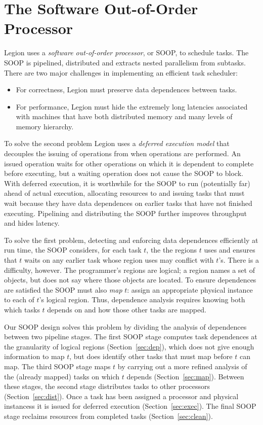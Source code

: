 \section{The Software Out-of-Order Processor}
\label{sec:soop}

Legion uses a {\em  software out-of-order processor}, or SOOP, to schedule tasks.  The SOOP 
is pipelined, distributed and extracts nested parallelism from subtasks.
There are two major challenges in implementing an efficient task scheduler:
\begin{itemize}
\item  For correctness, Legion must preserve data dependences between tasks.

\item For performance, Legion must hide the extremely long latencies associated
  with machines that have both distributed memory and many levels of
  memory hierarchy.
\end{itemize}

To solve the second problem Legion uses a {\em deferred execution model} that decouples the issuing
of operations from when operations are performed.  An issued operation waits for other operations on
which it is dependent to complete before executing, but a waiting operation does not cause the SOOP
to block.  With deferred execution, it is worthwhile for the SOOP to run (potentially far) ahead of actual execution,
allocating resources to and issuing tasks that must wait because they have data dependences on earlier tasks that have not 
finished executing.   Pipelining and distributing the SOOP further improves throughput and hides latency.

To solve the first problem, detecting and enforcing data dependences
efficiently at run time, the SOOP considers, for each task $t$, the
the regions $t$ uses and ensures that $t$ waits on any
earlier task whose region uses may conflict with $t$'s.  There is a
difficulty, however.  The programmer's regions are logical; a region
names a set of objects, but does not say where those objects
are located.  To ensure dependences are satisfied the SOOP must also {\em map} $t$: assign an
appropriate physical instance to each of $t$'s logical region.  Thus, dependence
analysis requires knowing both which tasks $t$ depends on and how those
other tasks are mapped.

Our SOOP design solves this problem by dividing the analysis of
dependences between two pipeline stages.  The first SOOP stage
computes task dependences at the granularity of logical regions
(Section~\ref{sec:dep}), which does not give enough information to map
$t$, but does identify other tasks that must map before $t$ can map.
The third SOOP stage maps $t$ by carrying out a more refined analysis
of the (already mapped) tasks on which $t$ depends
(Section~\ref{sec:map}).  Between these stages, the second stage
distributes tasks to other processors (Section~\ref{sec:dist}).  Once
a task has been assigned a processor and physical instancess it is
issued for deferred execution (Section~\ref{sec:exec}).  The final
SOOP stage reclaims resources from completed tasks
(Section~\ref{sec:clean}).

